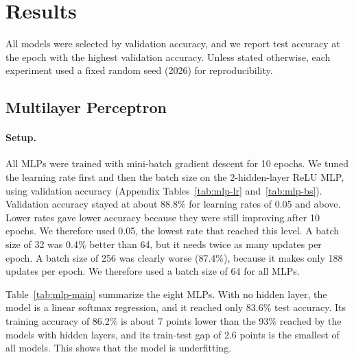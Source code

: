 \documentclass[11pt]{article}
\begin{document}
\section{Results}
All models were selected by validation accuracy, and we report test accuracy at the epoch with the
highest validation accuracy.
Unless stated otherwise, each experiment used a fixed random seed (2026) for reproducibility.

\subsection{Multilayer Perceptron}

\paragraph{Setup.}
All MLPs were trained with mini-batch gradient descent for 10 epochs. 
We tuned the learning rate first and then the batch size on the 2-hidden-layer ReLU MLP, using validation accuracy (Appendix Tables~\ref{tab:mlp-lr} and~\ref{tab:mlp-bs}).
Validation accuracy stayed at about 88.8\% for learning rates of 0.05 and above.
Lower rates gave lower accuracy because they were still improving after 10 epochs.
We therefore used 0.05, the lowest rate that reached this level.
A batch size of 32 was 0.4\% better than 64, but it needs twice as many updates per epoch. A batch size of 256 was clearly worse (87.4\%), because it makes only 188 updates per epoch. We therefore used a batch size of 64 for all MLPs. 

Table~\ref{tab:mlp-main} summarize the eight MLPs.
With no hidden layer, the model is a linear softmax regression, and it reached only 83.6\% test accuracy. Its training accuracy of 86.2\% is about 7 points lower than the 93\% reached by the models with hidden layers, and its train-test gap of 2.6 points is the smallest of all models. This shows that the model is underfitting.
\end{document}

